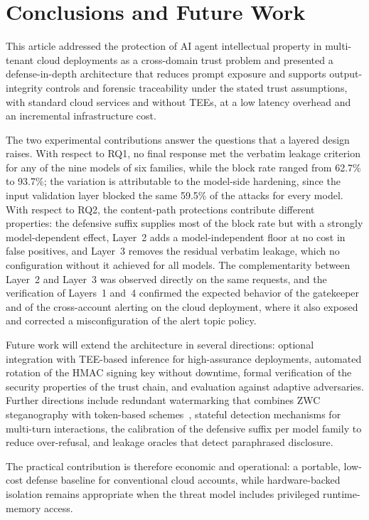 \section{Conclusions and Future Work}
\label{sec:conclusions}

This article addressed the protection of AI agent intellectual property in multi-tenant cloud deployments as a cross-domain trust problem and presented a defense-in-depth architecture that reduces prompt exposure and supports output-integrity controls and forensic traceability under the stated trust assumptions, with standard cloud services and without TEEs, at a low latency overhead and an incremental infrastructure cost.

The two experimental contributions answer the questions that a layered design raises. With respect to RQ1, no final response met the verbatim leakage criterion for any of the nine models of six families, while the block rate ranged from 62.7\% to 93.7\%; the variation is attributable to the model-side hardening, since the input validation layer blocked the same 59.5\% of the attacks for every model. With respect to RQ2, the content-path protections contribute different properties: the defensive suffix supplies most of the block rate but with a strongly model-dependent effect, Layer~2 adds a model-independent floor at no cost in false positives, and Layer~3 removes the residual verbatim leakage, which no configuration without it achieved for all models. The complementarity between Layer~2 and Layer~3 was observed directly on the same requests, and the verification of Layers~1 and~4 confirmed the expected behavior of the gatekeeper and of the cross-account alerting on the cloud deployment, where it also exposed and corrected a misconfiguration of the alert topic policy.

Future work will extend the architecture in several directions: optional integration with TEE-based inference for high-assurance deployments, automated rotation of the HMAC signing key without downtime, formal verification of the security properties of the trust chain, and evaluation against adaptive adversaries. Further directions include redundant watermarking that combines ZWC steganography with token-based schemes~\cite{kirchenbauer2023watermark,synthid2024}, stateful detection mechanisms for multi-turn interactions, the calibration of the defensive suffix per model family to reduce over-refusal, and leakage oracles that detect paraphrased disclosure.

The practical contribution is therefore economic and operational: a portable, low-cost defense baseline for conventional cloud accounts, while hardware-backed isolation remains appropriate when the threat model includes privileged runtime-memory access.
